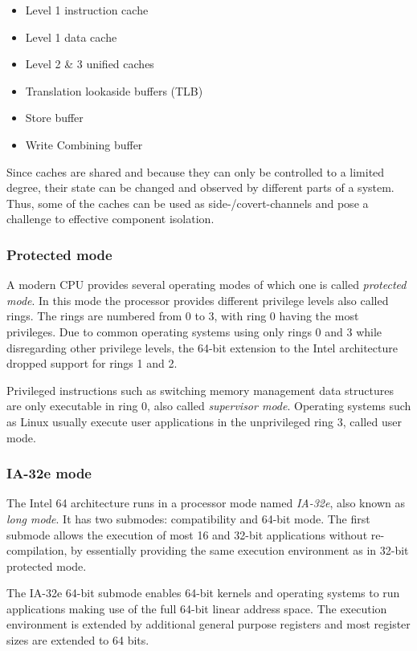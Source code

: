 \begin{itemize}
	\item Level 1 instruction cache
	\item Level 1 data cache
	\item Level 2 \& 3 unified caches
	\item Translation lookaside buffers (TLB)
	\item Store buffer
	\item Write Combining buffer
\end{itemize}

Since caches are shared and because they can only be controlled to a limited
degree, their state can be changed and observed by different parts of a system.
Thus, some of the caches can be used as side-/covert-channels and pose a
challenge to effective component isolation.

\subsubsection{Protected mode}
A modern CPU provides several operating modes of which one is called
\emph{protected mode}. In this mode the processor provides different privilege
levels also called rings. The rings are numbered from 0 to 3, with ring 0 having
the most privileges. Due to common operating systems using only rings 0 and 3
while disregarding other privilege levels, the 64-bit extension to the Intel
architecture dropped support for rings 1 and 2.

Privileged instructions such as switching memory management data structures are
only executable in ring 0, also called \emph{supervisor mode}. Operating systems
such as Linux usually execute user applications in the unprivileged ring 3,
called user mode.

\subsubsection{IA-32e mode}
The Intel 64 architecture runs in a processor mode named \emph{IA-32e}, also
known as \emph{long mode}. It has two submodes: compatibility and 64-bit mode.
The first submode allows the execution of most 16 and 32-bit applications
without re-compilation, by essentially providing the same execution environment
as in 32-bit protected mode.

The IA-32e 64-bit submode enables 64-bit kernels and operating systems to run
applications making use of the full 64-bit linear address space. The execution
environment is extended by additional general purpose registers and most
register sizes are extended to 64 bits.

